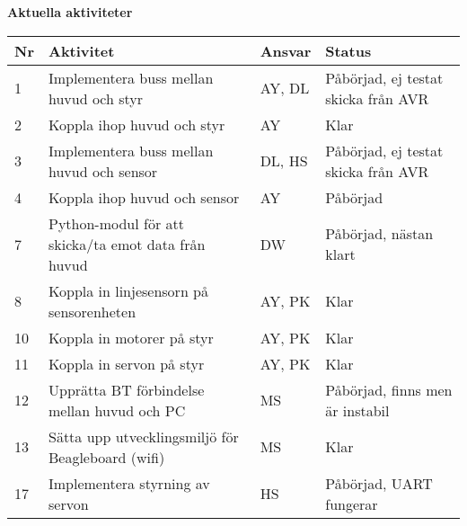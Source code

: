 \documentclass[titlepage, a4paper]{article}
\begin{document}
\newpage
\textbf{\Large Aktuella aktiviteter}
\begin{center}
\begin{tabularx}{\textwidth}{| p{4mm} | X | p{13.5mm} | X |}
	\hline
	\textbf{Nr} & \textbf{Aktivitet} & \textbf{Ansvar} & \textbf{Status} \\\hline	
	{1} & {Implementera buss mellan huvud och styr} & {AY, DL} & {Påbörjad, ej testat skicka från AVR} \\\hline
	{2} & {Koppla ihop huvud och styr} & {AY} & {Klar} \\\hline
	{3} & {Implementera buss mellan huvud och sensor} & {DL, HS} & {Påbörjad, ej testat skicka från AVR} \\\hline
	{4} & {Koppla ihop huvud och sensor} & {AY} & {Påbörjad} \\\hline
	{7} & {Python-modul för att skicka/ta emot data från huvud} & {DW} & {Påbörjad, nästan klart} \\\hline
	{8} & {Koppla in linjesensorn på sensorenheten} & {AY, PK} & {Klar} \\\hline
	{10} & {Koppla in motorer på styr} & {AY, PK} & {Klar} \\\hline
	{11} & {Koppla in servon på styr} & {AY, PK} & {Klar} \\\hline
	{12} & {Upprätta BT förbindelse mellan huvud och PC} & {MS} & {Påbörjad, finns men är instabil} \\\hline
	{13} & {Sätta upp utvecklingsmiljö för Beagleboard (wifi)} & {MS} & {Klar} \\\hline
	{17} & {Implementera styrning av servon} & {HS} & {Påbörjad, UART fungerar} \\\hline
\end{tabularx}
\end{center}
\end{document}
